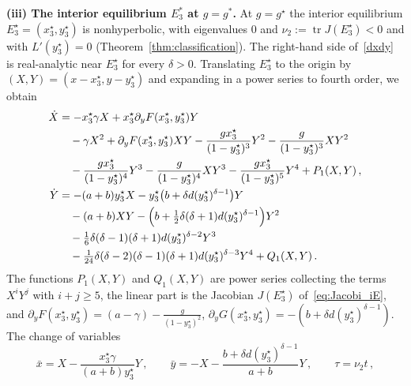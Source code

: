 \documentclass[reqno,11pt]{amsart}
\numberwithin{equation}{section}
\begin{document}
\begin{appendix}
\noindent\textbf{\textup{(iii)} The interior equilibrium $E_3^\ast$ at $g=g^\ast$.}\quad
At $g=g^\star$ the interior equilibrium $E_3^\star=(x_3^\star,y_3^\star)$ is nonhyperbolic, with eigenvalues $0$ and $\nu_2:=\operatorname{tr}J(E_3^\star)<0$ and with $L'(y_3^\star)=0$ (Theorem~\ref{thm:classification}). The right-hand side of~\eqref{dxdy} is real-analytic near $E_3^\star$ for every $\delta>0$. Translating $E_3^\star$ to the origin by $(X,Y)=(x-x_3^\star,y-y_3^\star)$ and expanding in a power series to fourth order, we obtain
\begin{subequations}\label{eq:E3_Trafo_1}
\begin{align}
\dot X &= -x_3^\star\gamma X + x_3^\star \partial_y F(x_3^\star,y_3^\star) Y \\
&\quad -\gamma X^2 + \partial_y F(x_3^\star,y_3^\star) XY - \frac{gx_3^\star}{(1-y_3^\star)^3}Y^2 - \frac{g}{(1-y_3^\star)^3}XY^2 \notag\\
&\quad - \frac{gx_3^\star}{(1-y_3^\star)^4}Y^3 - \frac{g}{(1-y_3^\star)^4}XY^3 - \frac{gx_3^\star}{(1-y_3^\star)^5}Y^4 + P_1(X,Y)\, , \notag\\
\dot Y &= -(a+b)y_3^\star X - y_3^\star\big(b+\delta d(y_3^\star)^{\delta-1}\big)Y \\
&\quad -(a+b)XY - \Big(b+\tfrac{1}{2}\delta(\delta+1)d(y_3^\star)^{\delta-1}\Big)Y^2 \notag\\
&\quad - \tfrac{1}{6}\delta(\delta-1)(\delta+1)d(y_3^\star)^{\delta-2}Y^3 \notag\\
&\quad - \tfrac{1}{24}\delta(\delta-2)(\delta-1)(\delta+1)d(y_3^\star)^{\delta-3}Y^4 + Q_1(X,Y)\,. \notag
\end{align}
\end{subequations}
The functions $P_1(X,Y)$ and $Q_1(X,Y)$ are power series collecting the terms $X^iY^j$ with $i+j\geq 5$, the linear part is the Jacobian $J(E_3^\star)$ of~\eqref{eq:Jacobi_iE}, and $\partial_y F(x_3^\star,y_3^\star)=(a-\gamma)-\tfrac{g}{(1-y_3^\star)^2}$, $\partial_y G(x_3^\star,y_3^\star)=-(b+\delta d(y_3^\star)^{\delta-1})$. The change of variables
\begin{equation}\label{eq:E3_Trafo_2}
\bar{x} = X - \frac{x_3^\star\gamma}{(a+b)y_3^\star} Y\, , \qquad \bar{y} = -X - \frac{b+\delta d(y_3^\star)^{\delta-1}}{a+b}Y\, , \qquad \tau = \nu_2 t\, ,
\end{equation}

\end{appendix}
\end{document}
